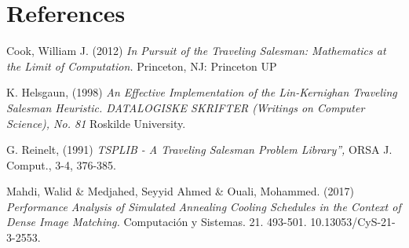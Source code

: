 \documentclass{article}
\begin{document}
\section{References}

\begin{thebibliography}{9}

Cook, William J. (2012) \emph{In Pursuit of the Traveling Salesman: Mathematics at the Limit of Computation.} Princeton, NJ: Princeton UP

K. Helsgaun, (1998) \emph{An Effective Implementation of the Lin-Kernighan Traveling Salesman Heuristic. DATALOGISKE SKRIFTER (Writings on Computer Science), No. 81} Roskilde University.

G. Reinelt, (1991) \emph{TSPLIB - A Traveling Salesman Problem Library”,} ORSA J. Comput., 3-4, 376-385.

Mahdi, Walid \& Medjahed, Seyyid Ahmed \& Ouali, Mohammed. (2017) \emph{Performance Analysis of Simulated Annealing Cooling Schedules in the Context of Dense Image Matching.} Computación y Sistemas. 21. 493-501. 10.13053/CyS-21-3-2553. 
\end{thebibliography}
\end{document}
